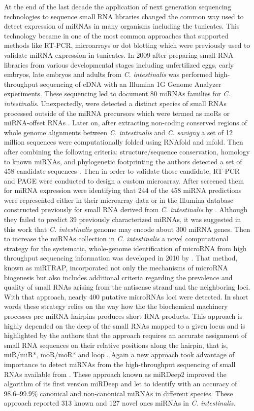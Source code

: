 \documentclass[graybox]{svmult}
\begin{document}
At the end of the last decade the application of next generation sequencing technologies to sequence small RNA libraries changed the common way used to detect expression of miRNAs in many organisms including the tunicates. This technology became in one of the most common approaches that supported methods like RT-PCR, microarrays or dot blotting which were previously used to validate miRNA expression in tunicates. In 2009 after preparing small RNA libraries from various developmental stages including unfertilized eggs, early
embryos, late embryos and adults from  \textit{C. intestinalis} was performed high-throughput sequencing of cDNA with an Illumina 1G Genome Analyzer experiments. These sequencing led to document 80 miRNAs families for  \textit{C. intestinalis}. Unexpectedly, were detected a distinct species of small RNAs processed outside of the miRNA precursors which were termed as moRs or miRNA-offset RNAs \cite{Shi2009}. Later on, after extracting non-coding conserved regions of whole genome alignments between  \textit{C. intestinalis} and \textit{C. savigny} a set of 12 million sequences were computationally folded using RNAfold and mfold. Then after combining the following criteria: structure/sequence conservation, homology to known miRNAs, and phylogenetic footprinting the authors detected 
a set of 458 candidate sequences \cite{Keshavan2010}. Then in order to validate those candidate, RT-PCR and PAGE were conducted to design a custom microarray. After screened them for miRNA expression were identifying that 244 of the 458 miRNA predictions were represented either in their microarray data or in the Illumina  database constructed previously for small RNA derived from \textit{C. intestinalis} by \cite{Shi2009}. Although they failed to predict 39 previously characterized miRNAs, it was suggested in this work that \textit{C. intestinalis} genome may encode about 300 miRNA genes. Then to increase the miRNAs collection in \textit{C. intestinalis} a novel computational strategy for the systematic, whole-genome identification of microRNA from high throughput sequencing information was developed in 2010 by \cite{Hendrix2010}. That method, known as miRTRAP, incorporated not only the mechanisms of microRNA biogenesis but also includes additional criteria regarding the prevalence and quality of small RNAs arising from the antisense strand and the neighboring loci. With that approach, nearly 400 putative microRNAs loci were detected. In short words these strategy relies on the way how the the biochemical machinery processes pre-miRNA hairpins produces short RNA products. This approach is highly depended on the deep of the small RNAs mapped to a given locus and is highlighted by the authors that the approach requires an accurate assignment of small RNA sequences on their relative positions along the hairpin, that is, miR/miR*, moR/moR* and loop \cite{Hendrix2010}. Again a new approach took advantage of importance to detect miRNAs from the high-throughput sequencing of small RNAs available from \cite{Shi2009}. These approach known as  miRDeep2 improved the algorithm of its first version  miRDeep \cite{Friedlander2012} and let to identify with an accuracy of 98.6–99.9\% canonical and non-canonical miRNAs in different species. These approach reported 313 known and 127 novel ones miRNAs in \textit{C. intestinalis}. 
\end{document}
